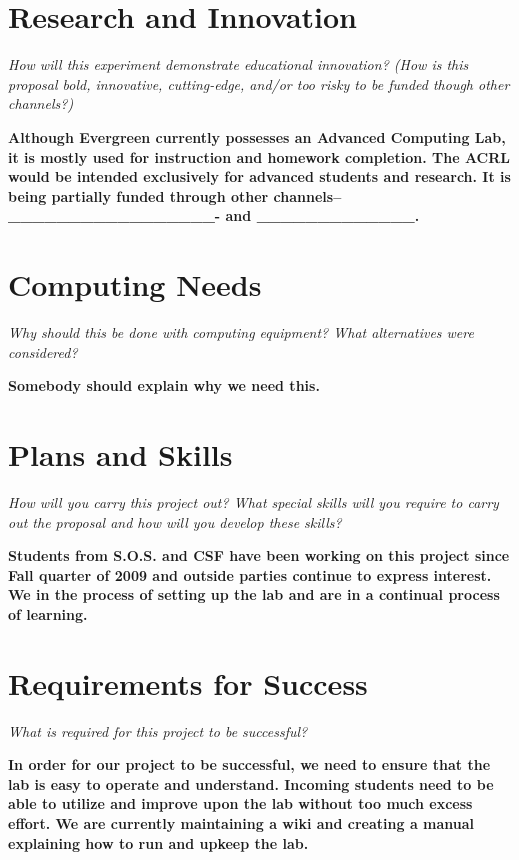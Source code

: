 \documentclass{article}
\begin{document}
\section{Research and Innovation}
\textit{How will this experiment demonstrate educational
innovation?  (How is this proposal bold, innovative, cutting-edge,
and/or too risky to be funded though other channels?)}

\textbf{Although Evergreen currently possesses an Advanced Computing Lab, it is mostly used for instruction and homework completion.  The ACRL would be intended exclusively for advanced students and research.  It is being partially funded through other channels--_________________- and _____________.    
}

\section{Computing Needs}
\textit{Why should this be done with computing equipment?
What alternatives were considered?}

\textbf{Somebody should explain why we need this.}


\linebreak
\linebreak



\section{Plans and Skills}
\textit{How will you carry this project out?  What special
skills will you require to carry out the proposal and how will you
develop these skills?}

\textbf{Students from S.O.S. and CSF have been working on this project since Fall quarter of 2009 and outside parties continue to express interest.  We in the process of setting up the lab and are in a continual process of learning.}


\section{Requirements for Success}
\textit{What is required for this project to be successful?}

\textbf{In order for our project to be successful, we need to ensure that the lab is easy to operate and understand.  Incoming students need to be able to utilize and improve upon the lab without too much excess effort.  We are currently maintaining a wiki and creating a manual explaining how to run and upkeep the lab.}
\end{document}

